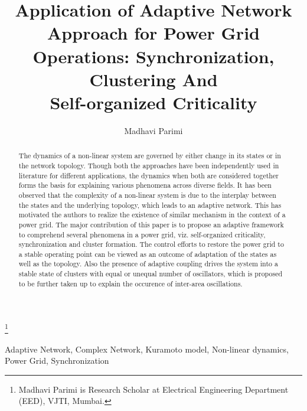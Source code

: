 \documentclass{ifacconf}
\begin{document}
\begin{frontmatter}

\title{Application of Adaptive Network Approach for Power Grid Operations: Synchronization, Clustering And\\ Self-organized Criticality} 

\thanks[footnoteinfo]{Madhavi Parimi is Research Scholar at Electrical Engineering Department (EED), VJTI, Mumbai.}

\author{Madhavi Parimi} 


\address{Electrical Engineering Department, 
   Veermata Jijabai Technological Institute, Mumbai, India (e-mail:madhaviparimi7@gmail.com)}

\begin{abstract}                %
The dynamics of a non-linear system are governed by either change in its states or in the network topology. Though both the approaches have been independently used in literature for different applications, the dynamics when both are considered together forms the basis for explaining various phenomena across diverse fields. It has been observed that the complexity of a non-linear system is due to the interplay between the states and the underlying topology, which leads to an adaptive network. This has motivated the authors to realize the existence of similar mechanism in the context of a power grid. The major contribution of this paper is to propose an adaptive framework to comprehend several phenomena in a power grid, viz. self-organized criticality, synchronization and cluster formation.  The control efforts to restore the power grid to a stable operating point can be viewed as an outcome of adaptation of the states as well as the topology. Also the presence of adaptive coupling drives the system into a stable state of clusters with equal or unequal number of oscillators, which is proposed to be further taken up to explain the occurence of inter-area oscillations.
\end{abstract}

\begin{keyword}
Adaptive Network, Complex Network, Kuramoto model, Non-linear dynamics, Power Grid, Synchronization
\end{keyword}

\end{frontmatter}
\end{document}
